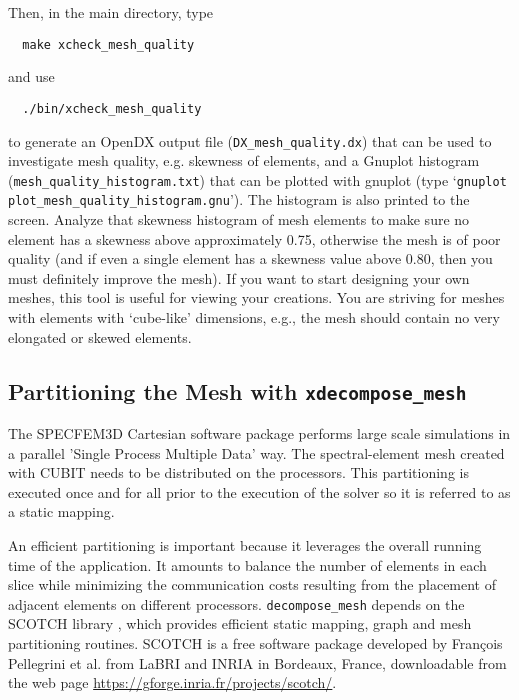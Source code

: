\noindent
Then, in the main directory, type
{\small
\begin{verbatim}
  make xcheck_mesh_quality
\end{verbatim}
}
and use
{\small
\begin{verbatim}
  ./bin/xcheck_mesh_quality
\end{verbatim}
}
to generate an %
OpenDX output file (\texttt{\small DX\_mesh\_quality.dx}{\small )
that can be used to investigate mesh quality, e.g. skewness of elements,
and a Gnuplot histogram (}\texttt{\small mesh\_quality\_histogram.txt}{\small )
that can be plotted with gnuplot (type `}\texttt{\small gnuplot plot\_mesh\_quality\_histogram.gnu}{\small ').
The histogram is also printed to the screen. Analyze that skewness
histogram of mesh elements to make sure no element has a skewness
above approximately 0.75, otherwise the mesh is of poor quality (and
if even a single element has a skewness value above 0.80, then you
must definitely improve the mesh). If you want to start designing
your own meshes, this tool is useful for viewing your creations. You
are striving for meshes with elements with `cube-like' dimensions,
e.g., the mesh should contain no very elongated or skewed elements.}{\small \par}


\subsection{Partitioning the Mesh with \texttt{xdecompose\_mesh}}

The SPECFEM3D Cartesian software package performs large scale simulations
in a parallel 'Single Process Multiple Data' way. The spectral-element
mesh created with CUBIT needs to be distributed on the processors.
This partitioning is executed once and for all prior to the execution
of the solver so it is referred to as a static mapping.

An efficient partitioning is important because it leverages the overall
running time of the application. It amounts to balance the number
of elements in each slice while minimizing the communication costs
resulting from the placement of adjacent elements on different processors.
\texttt{decompose\_mesh} depends on the SCOTCH library \citep{PeRo96},
which provides efficient static mapping, graph and mesh partitioning
routines. SCOTCH is a free software package developed by Fran\c{c}ois
Pellegrini et al. from LaBRI and INRIA in Bordeaux, France, downloadable
from the web page \url{https://gforge.inria.fr/projects/scotch/}.\\


